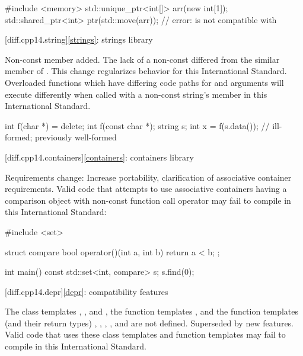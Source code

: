\begin{codeblock}
#include <memory>
std::unique_ptr<int[]> arr(new int[1]);
std::shared_ptr<int> ptr(std::move(arr)); // error:  is not compatible with 
\end{codeblock}

[diff.cpp14.string]{\ref{strings}: strings library}

\change
Non-const  member added.
\rationale
The lack of a non-const 
differed from the similar member of .
This change regularizes behavior for this International Standard.
\effect
Overloaded functions which have differing code paths
for  and  arguments
will execute differently
when called with a non-const string's  member
in this International Standard.

\begin{codeblock}
int f(char *) = delete;
int f(const char *);
string s;
int x = f(s.data()); // ill-formed; previously well-formed
\end{codeblock}

[diff.cpp14.containers]{\ref{containers}: containers library}

\change
Requirements change:
\rationale
Increase portability, clarification of associative container requirements.
\effect
Valid \CppXIV{} code that attempts to use associative containers
having a comparison object with non-const function call operator
may fail to compile in this International Standard:

\begin{codeblock}
#include <set>

struct compare
{
  bool operator()(int a, int b)
  {
    return a < b;
  }
};

int main() {
  const std::set<int, compare> s;
  s.find(0);
}
\end{codeblock}

[diff.cpp14.depr]{\ref{depr}: compatibility features}

\nodiffref
\change
The class templates
,
, and
,
the function templates
,
and the function templates (and their return types)
,
,
,
, and
are not defined.
\rationale
Superseded by new features.
\effect
Valid \CppXIV{} code that uses these class templates
and function templates may fail to compile in this International Standard.


